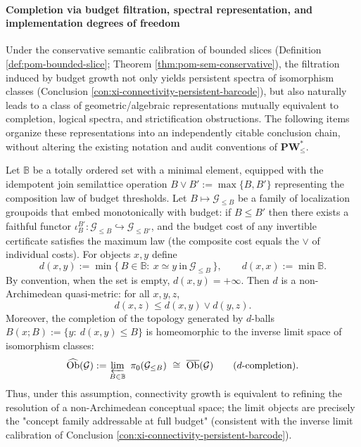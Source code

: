 
\paragraph{Completion via budget filtration, spectral representation, and implementation degrees of freedom}
Under the conservative semantic calibration of bounded slices (Definition \ref{def:pom-bounded-slice}; Theorem \ref{thm:pom-sem-conservative}), the filtration induced by budget growth not only yields persistent spectra of isomorphism classes (Conclusion \ref{con:xi-connectivity-persistent-barcode}), but also naturally leads to a class of geometric/algebraic representations mutually equivalent to completion, logical spectra, and strictification obstructions.
The following items organize these representations into an independently citable conclusion chain, without altering the existing notation and audit conventions of \(\mathbf{PW}^{\ast}_{\le}\).

\begin{conclusion}\label{con:xi-budget-nonarchimedean-geometry-completion}
Let \(\mathbb{B}\) be a totally ordered set with a minimal element, equipped with the idempotent join semilattice operation
\(
B\vee B':=\max\{B,B'\}
\)
representing the composition law of budget thresholds.
Let \(B\mapsto\mathcal{G}_{\le B}\) be a family of localization groupoids that embed monotonically with budget: if \(B\le B'\) then there exists a faithful functor \(\iota_{B}^{B'}:\mathcal{G}_{\le B}\hookrightarrow\mathcal{G}_{\le B'}\), and the budget cost of any invertible certificate satisfies the maximum law (the composite cost equals the \(\vee\) of individual costs).
For objects \(x,y\) define
\[
d(x,y):=\min\{\,B\in\mathbb{B}:\ x\simeq y\ \text{in}\ \mathcal{G}_{\le B}\,\},
\qquad d(x,x):=\min\mathbb{B}.
\]
By convention, when the set is empty, \(d(x,y)=+\infty\).
Then \(d\) is a non-Archimedean quasi-metric: for all \(x,y,z\),
\[
d(x,z)\le d(x,y)\vee d(y,z).
\]
Moreover, the completion of the topology generated by \(d\)-balls \(B(x;B):=\{y:\ d(x,y)\le B\}\) is homeomorphic to the inverse limit space of isomorphism classes:
\[
\widehat{\mathrm{Ob}}(\mathcal{G})
:=\varprojlim_{B\in\mathbb{B}}\ \pi_0(\mathcal{G}_{\le B})
\ \cong\
\overline{\mathrm{Ob}}(\mathcal{G})\qquad(\text{\(d\)-completion}).
\]
Thus, under this assumption, connectivity growth is equivalent to refining the resolution of a non-Archimedean conceptual space; the limit objects are precisely the "concept family addressable at full budget" (consistent with the inverse limit calibration of Conclusion \ref{con:xi-connectivity-persistent-barcode}).
\end{conclusion}

